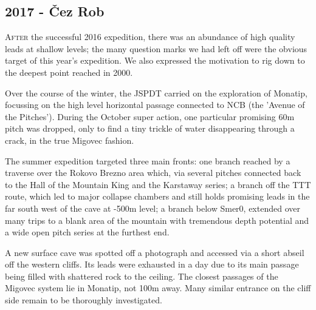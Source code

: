 \newpage
  
\begin{tcolorbox}

\chapter{2017 - Čez Rob}
	
	\lettrine{A}{fter} the successful 2016 expedition, there was an abundance of high quality leads at shallow levels; the many question marks we had left off were the obvious target of this year's expedition. We also expressed the motivation to rig down to the deepest point reached in 2000.

	Over the course of the winter, the JSPDT carried on the exploration of Monatip, focussing on the high level horizontal passage connected to NCB (the 'Avenue of the Pitches'). During the October super action, one particular promising 60m pitch was dropped, only to find a tiny trickle of water disappearing through a crack, in the true Migovec fashion.

	The summer expedition targeted three main fronts: one branch reached by a traverse over the Rokovo Brezno area which, via several pitches connected back to the Hall of the Mountain King and the Karstaway series; a branch off the TTT route, which led to major collapse chambers and still holds promising leads in the far south west of the cave at -500m level; a branch below Smer0, extended over many trips to a blank area of the mountain with tremendous depth potential and a wide open pitch series at the furthest end.

	A new surface cave was spotted off a photograph and accessed via a short abseil off the western cliffs. Its leads were exhausted in a day due to its main passage being filled with shattered rock to the ceiling. The closest passages of the Migovec system lie in Monatip, not 100m away. Many similar entrance on the cliff side remain to be thoroughly investigated.

\end{tcolorbox}

